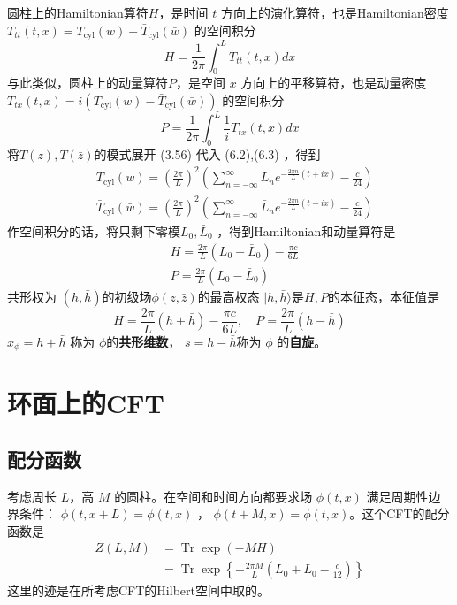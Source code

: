 圆柱上的Hamiltonian算符$ H $，是时间 $t$ 方向上的演化算符，也是Hamiltonian密度$ T_{t t}(t, x)=T_{\mathrm{cyl}}(w)+\bar{T}_{\mathrm{cyl}}(\bar{w})$ 的空间积分
\begin{equation}
	H=\frac{1}{2 \pi} \int_{0}^{L} T_{t t}(t, x) d x 
\end{equation}
与此类似，圆柱上的动量算符$ P $，是空间 $x$ 方向上的平移算符，也是动量密度 $T_{t x}(t,x)=i\left(T_{\mathrm{cyl}}(w)-\bar{T}_{\mathrm{cyl}}(\bar{w})\right)$ 的空间积分
\begin{equation}
	P=\frac{1}{2 \pi} \int_{0}^{L} \frac{1}{i} T_{t x}(t, x) d x 
\end{equation}
将$ T(z), \bar{T}(\bar{z}) $的模式展开 (3.56) 代入 (6.2),(6.3) ，得到
\begin{align} &T_{\mathrm{cyl}}(w)=\left(\frac{2 \pi}{L}\right)^{2}\left(\sum_{n=-\infty}^{\infty} L_{n} e^{-\frac{2 \pi n}{L}(t+i x)}-\frac{c}{24}\right) \\ &\bar{T}_{\mathrm{cyl}}(\bar{w})=\left(\frac{2 \pi}{L}\right)^{2}\left(\sum_{n=-\infty}^{\infty} \bar{L}_{n} e^{-\frac{2 \pi n}{L}(t-i x)}-\frac{c}{24}\right) \end{align}
作空间积分的话，将只剩下零模$ L_{0}, \bar{L}_{0}$ ，得到Hamiltonian和动量算符是
\begin{align} &H=\frac{2 \pi}{L}\left(L_{0}+\bar{L}_{0}\right)-\frac{\pi c}{6 L}\\ &P=\frac{2 \pi}{L}\left(L_{0}-\bar{L}_{0}\right) \end{align}
共形权为 $(h, \bar{h}) $的初级场$ \phi(z, \bar{z}) $的最高权态 $|h, \bar{h}\rangle $是$ H,P$的本征态，本征值是
\begin{equation}
H=\frac{2 \pi}{L}(h+\bar{h})-\frac{\pi c}{6 L}, \quad P=\frac{2 \pi}{L}(h-\bar{h})
\end{equation} 
$x_{\phi}=h+\bar{h}$ 称为 $\phi $的\textbf{共形维数}， $s=h-\bar{h} $称为 $\phi$ 的\textbf{自旋}。

\section{环面上的CFT}
\subsection{配分函数}
考虑周长 $L $，高 $M$ 的圆柱。在空间和时间方向都要求场 $\phi(t,x)$ 满足周期性边界条件： $\phi(t, x+L)=\phi(t, x)$ ， $\phi(t+M, x)=\phi(t, x) $。这个CFT的配分函数是
\begin{equation}
\begin{aligned} Z(L, M) &=\operatorname{Tr} \exp (-M H) \\ &=\operatorname{Tr} \exp \left\{-\frac{2 \pi M}{L}\left(L_{0}+\bar{L}_{0}-\frac{c}{12}\right)\right\} 	
\end{aligned}
\end{equation}
这里的迹是在所考虑CFT的Hilbert空间中取的。

